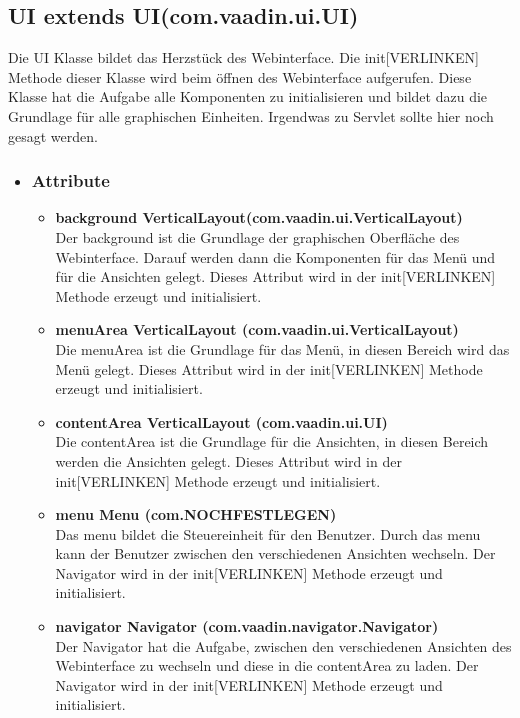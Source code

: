 \newpage
\subsection{UI extends UI(com.vaadin.ui.UI)}
Die UI Klasse bildet das Herzstück des Webinterface. Die init[VERLINKEN] Methode dieser Klasse wird beim öffnen des Webinterface aufgerufen. Diese Klasse hat die Aufgabe alle Komponenten zu initialisieren und bildet dazu die Grundlage für alle graphischen Einheiten. Irgendwas zu Servlet sollte hier noch gesagt werden.
\begin{itemize}
\item \subsubsection{Attribute}
\begin{itemize}
\item \textbf{background VerticalLayout(com.vaadin.ui.VerticalLayout)} \hfill\\ 
Der background ist die Grundlage der graphischen Oberfläche des Webinterface. Darauf werden dann die Komponenten für das Menü und für die Ansichten gelegt. Dieses Attribut wird in der init[VERLINKEN] Methode erzeugt und initialisiert.

\item \textbf{menuArea VerticalLayout (com.vaadin.ui.VerticalLayout)} \hfill\\ 
Die menuArea ist die Grundlage für das Menü, in diesen Bereich wird das Menü gelegt. Dieses Attribut wird in der init[VERLINKEN] Methode erzeugt und initialisiert.

\item \textbf{contentArea VerticalLayout (com.vaadin.ui.UI)} \hfill\\ 
Die contentArea ist die Grundlage für die Ansichten, in diesen Bereich werden die Ansichten gelegt. Dieses Attribut wird in der init[VERLINKEN] Methode erzeugt und initialisiert.

\item \textbf{menu Menu (com.NOCHFESTLEGEN)} \hfill\\ 
Das menu bildet die Steuereinheit für den Benutzer. Durch das menu kann der Benutzer zwischen den verschiedenen Ansichten wechseln. Der Navigator wird in der init[VERLINKEN] Methode erzeugt und initialisiert.

\item \textbf{navigator Navigator (com.vaadin.navigator.Navigator)} \hfill\\ 
Der Navigator hat die Aufgabe, zwischen den verschiedenen Ansichten des Webinterface zu wechseln und diese in die contentArea zu laden. Der Navigator wird in der init[VERLINKEN] Methode erzeugt und initialisiert.


\end{itemize}
\end{itemize}

